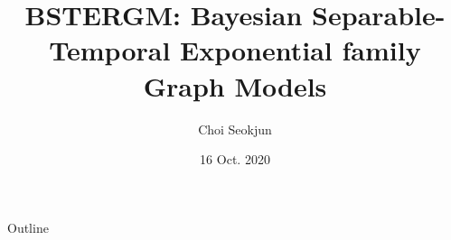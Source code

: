 \documentclass[aspectratio=169,ignorenonframetext,9pt]{beamer}
\title{BSTERGM: Bayesian Separable-Temporal Exponential family Graph Models}
\author{Choi Seokjun}
\date{16 Oct. 2020}
\theoremstyle{plain}
\theoremstyle{definition}
\begin{document}
\begin{frame}
\maketitle
\end{frame}




\begin{frame}{Outline}
\tableofcontents
\end{frame}
\end{document}
